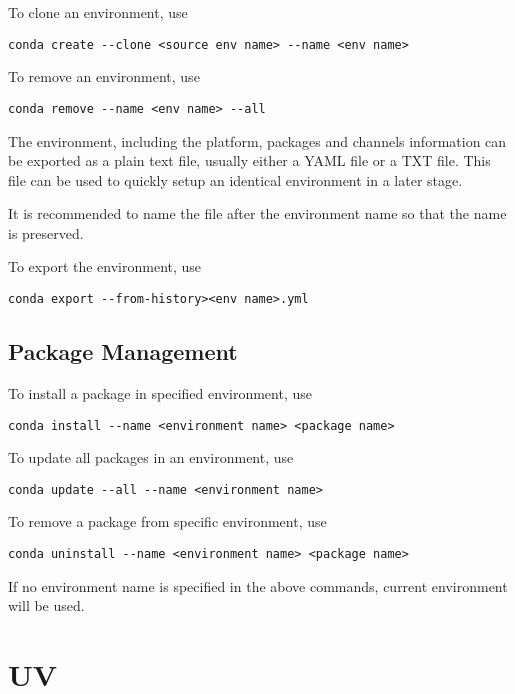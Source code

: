 To clone an environment, use
\begin{lstlisting}
conda create --clone <source env name> --name <env name>
\end{lstlisting}

To remove an environment, use
\begin{lstlisting}
conda remove --name <env name> --all
\end{lstlisting}

The environment, including the platform, packages and channels information can be exported as a plain text file, usually either a YAML file or a TXT file. This file can be used to quickly setup an identical environment in a later stage.

It is recommended to name the file after the environment name so that the name is preserved.

To export the environment, use
\begin{lstlisting}
conda export --from-history><env name>.yml
\end{lstlisting}

\subsection{Package Management}

To install a package in specified environment, use
\begin{lstlisting}
conda install --name <environment name> <package name>
\end{lstlisting}

To update all packages in an environment, use
\begin{lstlisting}
conda update --all --name <environment name>
\end{lstlisting}

To remove a package from specific environment, use
\begin{lstlisting}
conda uninstall --name <environment name> <package name>
\end{lstlisting}

If no environment name is specified in the above commands, current environment will be used.

\section{UV}

